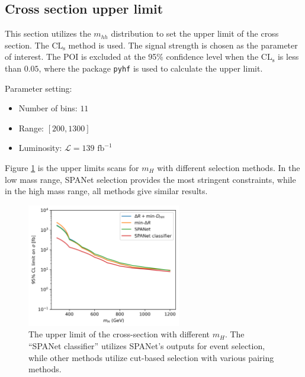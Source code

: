 \documentclass[12pt]{article}
\begin{document}
	\subsection{Cross section upper limit}%
	\label{sub:cross_section_upper_limit}
		
		This section utilizes the $m_{hh}$ distribution to set the upper limit of the cross section. The $\text{CL}_{\text{s}}$ method is used. The signal strength is chosen as the parameter of interest. The POI is excluded at the 95\% confidence level when the $\text{CL}_{\text{s}}$ is less than $0.05$, where the package \verb+pyhf+ is used to calculate the upper limit. 

		Parameter setting:
		\begin{itemize}
			\item Number of bins: $11$
			\item Range: $[200,1300]$
			\item Luminosity: $\mathcal{L} = 139 \text{ fb}^{-1}$
		\end{itemize}
		
		Figure \ref{fig:CL_limit_resonant} is the upper limits scans for $m_H$ with different selection methods. In the low mass range, SPANet selection provides the most stringent constraints, while in the high mass range, all methods give similar results.
		\begin{figure}[htpb]
			\centering
			\includegraphics[width=0.6\textwidth]{CLs_upper_limit_resonant.png}
			\caption{The upper limit of the cross-section with different $m_H$. The ``SPANet classifier'' utilizes SPANet's outputs for event selection, while other methods utilize cut-based selection with various pairing methods.}
			\label{fig:CL_limit_resonant}
		\end{figure}
\end{document}
